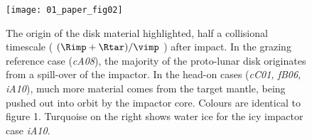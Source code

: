 \begin{figure}
\begin{center}
\texttt{[image: 01\_paper\_fig02]}
\caption{The origin of the disk material highlighted, half a collisional timescale ( $ (\Rimp + \Rtar) / \vimp$ ) after impact. In the grazing reference case (\emph{cA08}), the majority of the proto-lunar disk originates from a spill-over of the impactor. In the head-on cases (\emph{cC01, fB06, iA10}), much more material comes from the target mantle, being pushed out into orbit by the impactor core. Colours are
identical to figure 1. Turquoise on the right shows water ice for the icy impactor case \emph{iA10}.}
\label{ch05_fig01b}
\end{center}
\end{figure}









